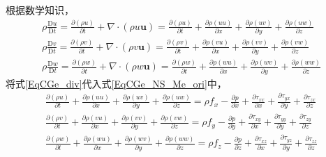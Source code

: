 根据数学知识，
\begin{equation}
  \begin{aligned}
    \rho \frac{\mathrm{D}u}{\mathrm{D}t}
    =
    \frac{\partial (\rho u)}{\partial t}
    +
    \nabla\cdot(\rho u\mathbf{u})
    =
    \frac{\partial (\rho u)}{\partial t}
    +
    \frac{\partial \rho (uu)}{\partial x}
    +
    \frac{\partial \rho (uv)}{\partial y}
    +
    \frac{\partial \rho (uw)}{\partial z}
    \\
    \rho \frac{\mathrm{D}v}{\mathrm{D}t}
    =
    \frac{\partial (\rho v)}{\partial t}
    +
    \nabla\cdot(\rho v\mathbf{u})
    =
    \frac{\partial (\rho v)}{\partial t}
    +
    \frac{\partial \rho (vu)}{\partial x}
    +
    \frac{\partial \rho (vv)}{\partial y}
    +
    \frac{\partial \rho (vw)}{\partial z}
    \\
    \rho \frac{\mathrm{D}w}{\mathrm{D}t}
    =
    \frac{\partial (\rho w)}{\partial t}
    +
    \nabla\cdot(\rho w\mathbf{u})
    =
    \frac{\partial (\rho w)}{\partial t}
    +
    \frac{\partial \rho (wu)}{\partial x}
    +
    \frac{\partial \rho (wv)}{\partial y}
    +
    \frac{\partial \rho (ww)}{\partial z}
  \end{aligned}
  \label{EqCGe_div}
\end{equation}
将式\eqref{EqCGe_div}代入式\eqref{EqCGe_NS_Me_ori}中，
\begin{equation}
  \begin{aligned}
    \frac{\partial (\rho u)}{\partial t}
    +
    \frac{\partial \rho (uu)}{\partial x}
    +
    \frac{\partial \rho (uv)}{\partial y}
    +
    \frac{\partial \rho (uw)}{\partial z}
    =
    \rho f_{x}
    -\frac{\partial p}{\partial x}
    +\frac{\partial \tau_{xx}}{\partial x}
    +\frac{\partial \tau_{yx}}{\partial y}
    +\frac{\partial \tau_{zx}}{\partial z}
    \\
    \frac{\partial (\rho v)}{\partial t}
    +
    \frac{\partial \rho (vu)}{\partial x}
    +
    \frac{\partial \rho (vv)}{\partial y}
    +
    \frac{\partial \rho (vw)}{\partial z}
    =
    \rho f_{y}
    -\frac{\partial p}{\partial y}
    +\frac{\partial \tau_{xy}}{\partial x}
    +\frac{\partial \tau_{yy}}{\partial y}
    +\frac{\partial \tau_{zy}}{\partial z}
    \\
    \frac{\partial (\rho w)}{\partial t}
    +
    \frac{\partial \rho (wu)}{\partial x}
    +
    \frac{\partial \rho (wv)}{\partial y}
    +
    \frac{\partial \rho (ww)}{\partial z}
    =
    \rho f_{z}
    -\frac{\partial p}{\partial z}
    +\frac{\partial \tau_{xz}}{\partial x}
    +\frac{\partial \tau_{yz}}{\partial y}
    +\frac{\partial \tau_{zz}}{\partial z}
  \end{aligned}
  \label{EqCGe_NS_Me_general}
\end{equation}


